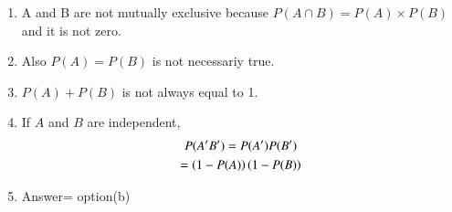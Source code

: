 \begin{enumerate}
\item A and B are not mutually exclusive because $P(A \cap B)= P(A)\times P(B)$ and it is not zero.
\item Also $P(A) = P(B)$ is not necessariy true. 
\item $P(A) + P(B)$ is not always equal to 1.
\item If $A$ and $B$ are independent,
\begin{multline}
P(A^\prime B^\prime) = P(A^\prime)P(B^\prime) 
\\
= \left(1-P(A)\right)\left(1-P(B)\right)
\end{multline}
\item Answer= option(b)

\end{enumerate}
